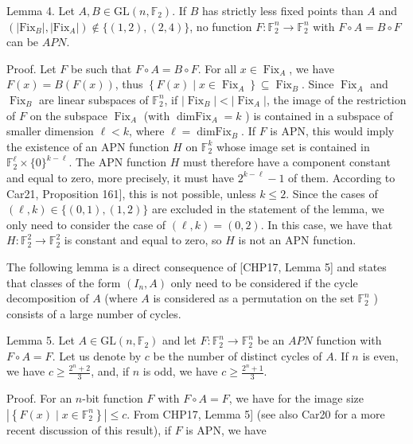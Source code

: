 \documentclass[10pt]{article}
\begin{document}
Lemma 4. Let $A, B \in \mathrm{GL}\left(n, \mathbb{F}_{2}\right)$. If $B$ has strictly less fixed points than $A$ and $\left(\left|\mathrm{Fix}_{B}\right|,\left|\mathrm{Fix}_{A}\right|\right) \notin \{(1,2),(2,4)\}$, no function $F: \mathbb{F}_{2}^{n} \rightarrow \mathbb{F}_{2}^{n}$ with $F \circ A=B \circ F$ can be $A P N$.

Proof. Let $F$ be such that $F \circ A=B \circ F$. For all $x \in \operatorname{Fix}_{A}$, we have $F(x)=B(F(x))$, thus $\left\{F(x) \mid x \in \operatorname{Fix}_{A}\right\} \subseteq \operatorname{Fix}_{B}$. Since $\operatorname{Fix}_{A}$ and $\operatorname{Fix}_{B}$ are linear subspaces of $\mathbb{F}_{2}^{n}$, if $\left|\operatorname{Fix}_{B}\right|<\left|\operatorname{Fix}_{A}\right|$, the image of the restriction of $F$ on the subspace $\operatorname{Fix}_{A}$ (with $\operatorname{dimFix}_{A}=k$ ) is contained in a subspace of smaller dimension $\ell<k$, where $\ell=\operatorname{dimFix}_{B}$. If $F$ is APN, this would imply the existence of an APN function $H$ on $\mathbb{F}_{2}^{k}$ whose image set is contained in $\mathbb{F}_{2}^{\ell} \times\{0\}^{k-\ell}$. The APN function $H$ must therefore have a component constant and equal to zero, more precisely, it must have $2^{k-\ell}-1$ of them. According to Car21, Proposition 161], this is not possible, unless $k \leq 2$. Since the cases of $(\ell, k) \in\{(0,1),(1,2)\}$ are excluded in the statement of the lemma, we only need to consider the case of $(\ell, k)=(0,2)$. In this case, we have that $H: \mathbb{F}_{2}^{2} \rightarrow \mathbb{F}_{2}^{2}$ is constant and equal to zero, so $H$ is not an APN function.

The following lemma is a direct consequence of [CHP17, Lemma 5] and states that classes of the form $\left(I_{n}, A\right)$ only need to be considered if the cycle decomposition of $A$ (where $A$ is considered as a permutation on the set $\mathbb{F}_{2}^{n}$ ) consists of a large number of cycles.

Lemma 5. Let $A \in \mathrm{GL}\left(n, \mathbb{F}_{2}\right)$ and let $F: \mathbb{F}_{2}^{n} \rightarrow \mathbb{F}_{2}^{n}$ be an $A P N$ function with $F \circ A=F$. Let us denote by $c$ be the number of distinct cycles of $A$. If $n$ is even, we have $c \geq \frac{2^{n}+2}{3}$, and, if $n$ is odd, we have $c \geq \frac{2^{n}+1}{3}$.

Proof. For an $n$-bit function $F$ with $F \circ A=F$, we have for the image size $\left|\left\{F(x) \mid x \in \mathbb{F}_{2}^{n}\right\}\right| \leq c$. From CHP17, Lemma 5] (see also Car20 for a more recent discussion of this result), if $F$ is APN, we have
\end{document}
